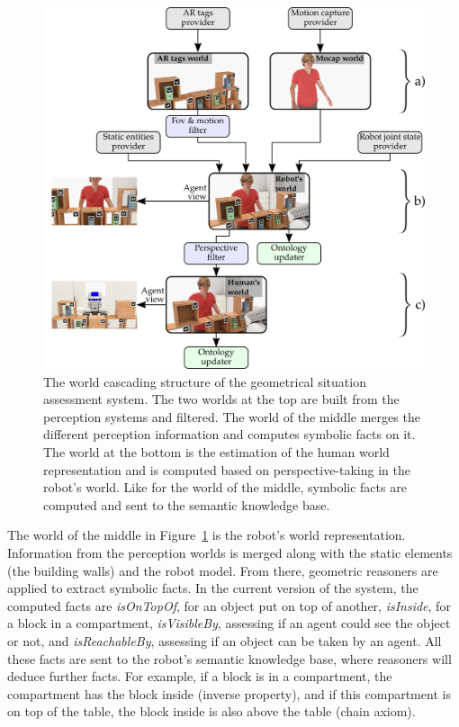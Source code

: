 \documentclass[a4paper,11pt,twoside]{StyleThese}
\begin{document}
\begin{figure}[b!]
	\centering
	\includegraphics[scale=0.12]{figures/chapter4/uwds/uwds.png}
	\caption{\label{chap9:fig:uwds} The world cascading structure of the geometrical situation assessment system. The two worlds at the top are built from the perception systems and filtered. The world of the middle merges the different perception information and computes symbolic facts on it. The world at the bottom is the estimation of the human world representation and is computed based on perspective-taking in the robot's world. Like for the world of the middle, symbolic facts are computed and sent to the semantic knowledge base.}
\end{figure}


The world of the middle in Figure~\ref{chap9:fig:uwds} is the robot's world representation. Information from the perception worlds is merged along with the static elements (the building walls) and the robot model.
From there, geometric reasoners are applied to extract symbolic facts. In the current version of the system, the computed facts are \textit{isOnTopOf}, for an object put on top of another, \textit{isInside}, for a block in a compartment, \textit{isVisibleBy}, assessing if an agent could see the object or not, and \textit{isReachableBy}, assessing if an object can be taken by an agent. All these facts are sent to the robot's semantic knowledge base, where reasoners will deduce further facts. For example, if a block is in a compartment, the compartment has the block inside (inverse property), and if this compartment is on top of the table, the block inside is also above the table (chain axiom).
\end{document}
